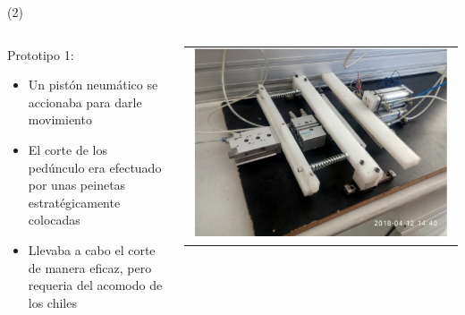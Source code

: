 \begin{frame}{ (2)}
\begin{columns}
\begin{column}{0.50\textwidth}
Prototipo 1:
\begin{itemize}
        \item Un pistón neumático se accionaba para darle movimiento 
        \item El corte de los pedúnculo era efectuado por unas peinetas estratégicamente colocadas
        \item Llevaba a cabo el corte de manera eficaz, pero requeria del acomodo de los chiles
	\end{itemize}
\end{column}
\begin{column}{0.50\textwidth}  
\begin{center}
     \begin{tabular}{c}
         \includegraphics[width=0.98\textwidth]{2022_MaquinaChilePiquin/figs/Prototipo1.png}\\
          \end{tabular}
\end{center}
\end{column} 
\end{columns} 
\end{frame}



